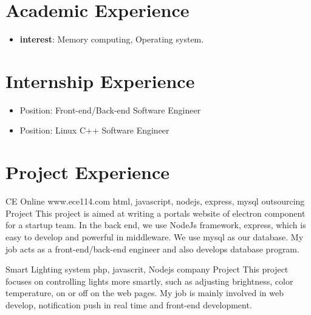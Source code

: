 \documentclass[11pt,a4paper]{moderncv}
\begin{document}
\section{Academic Experience}
{
\begin{itemize}
    \item \textbf{interest}: Memory computing, Operating system.
\end{itemize}
}


\section{Internship Experience}
{
\begin{itemize}
\item Position: Front-end/Back-end Software Engineer
\end{itemize}
}

{
\begin{itemize}
\item Position: Linux C++ Software Engineer
\end{itemize}
}

\section{Project Experience}
{CE Online www.ece114.com}
{html, javascript, nodejs, express, mysql}
{outsourcing Project}
{}
{
This project is aimed at writing a portals website of electron component for a startup team. In the back end, we use NodeJs framework, express, which is easy to develop and powerful in middleware. We use mysql as our database. My job acts as a front-end/back-end engineer and also develops database program.\\
}

\vspace*{0.2\baselineskip}
{Smart Lighting system}
{php, javascrit, Nodejs}
{company Project}
{}
{
This project focuses on controlling lights more smartly, such as adjusting brightness, color temperature, on or off on the web pages.  My job is mainly involved in web develop, notification push in real time and front-end development.\\
}
\end{document}
